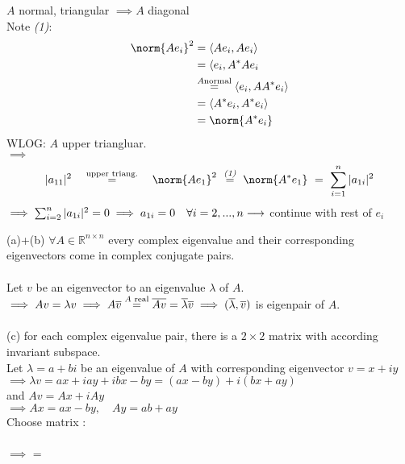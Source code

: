 
\begin{SolutionSheet}[\ref{sheet5}]

  \begin{Solution}
    \Claim $A$ normal, triangular $\implies A$ diagonal \\
    \Proof Note \textit{(1)}: \begin{align*}
        \norm{Ae_i}^2 &= \langle Ae_i, Ae_i \rangle \\
        &= \langle e_i, A^*Ae_i \\
        &\stackrel{A \text{normal}}{=} \langle e_i, AA^* e_i \rangle \\
        &= \langle A^*e_i , A^*e_i \rangle \\
        &= \norm{A^*e_i}
      \end{align*}
      WLOG: $A$ upper triangluar.\\
      $\implies$ \begin{equation*}
        | a_{11} |^2 \quad \stackrel{\text{upper triang.}}{=} \quad \norm{Ae_1}^2 \
        \stackrel{\textit{(1)}}{=} \ \norm{A^*e_1} \ = \ \sum_{i=1}^{n} | a_{1i} |^2
      \end{equation*}
      $\implies \sum_{i=2}^{n} | a_{1i}|^2 = 0 \\
      \implies a_{1i} = 0 \quad \forall i=2,...,n\\
      \longrightarrow$ continue with rest of $e_i$
  \end{Solution}

  \begin{Solution}
    (a)+(b) \Claim $\forall A \in \mathbb{R}^{n\times n}$ every complex eigenvalue and their 
    corresponding eigenvectors come in complex conjugate pairs. \\
    \\
    \Proof Let $v$ be an eigenvector to an eigenvalue $\lambda$ of $A$.\\
    $\implies Av = \lambda v \\
    \implies A \overline{v} \stackrel{A \text{ real}}{=} \overline{Av} = \overline{\lambda} \overline{v} \\
    \implies (\overline{\lambda}, \overline{v})$ is eigenpair of $A$. \\
    \\
    (c) \Claim for each complex eigenvalue pair, there is a $2\times 2$ matrix with according invariant subspace.\\
    \Proof Let $\lambda=a+bi$ be an eigenvalue of $A$ with corresponding eigenvector $v= x+iy$ \\
    $\implies \lambda v = ax+iay+ibx-by = (ax-by) + i(bx+ay)$ \\
    and  $Av = Ax + iAy$ \\
    $\implies Ax = ax-by, \quad Ay = ab+ay$ \\
    Choose matrix : \\
    \\
    $\implies$   = 
  \end{Solution}


\end{SolutionSheet}
